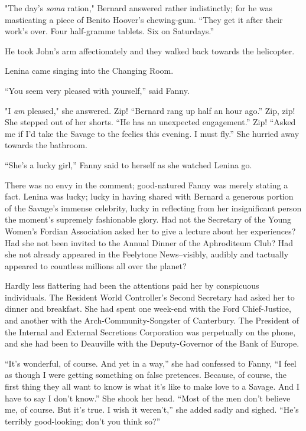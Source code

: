 \documentclass[12pt]{report}
\begin{document}
"The day's \emph{soma} ration," Bernard answered rather indistinctly;
for he was masticating a piece of Benito Hoover's chewing-gum. ``They
get it after their work's over. Four half-gramme tablets. Six on
Saturdays.''

He took John's arm affectionately and they walked back towards the
helicopter.

Lenina came singing into the Changing Room.

``You seem very pleased with yourself,'' said Fanny.

"I \emph{am} pleased," she answered. Zip! ``Bernard rang up half an hour
ago.'' Zip, zip! She stepped out of her shorts. ``He has an unexpected
engagement.'' Zip! ``Asked me if I'd take the Savage to the feelies this
evening. I must fly.'' She hurried away towards the bathroom.

``She's a lucky girl,'' Fanny said to herself as she watched Lenina go.

There was no envy in the comment; good-natured Fanny was merely stating
a fact. Lenina was lucky; lucky in having shared with Bernard a generous
portion of the Savage's immense celebrity, lucky in reflecting from her
insignificant person the moment's supremely fashionable glory. Had not
the Secretary of the Young Women's Fordian Association asked her to give
a lecture about her experiences? Had she not been invited to the Annual
Dinner of the Aphroditeum Club? Had she not already appeared in the
Feelytone News--visibly, audibly and tactually appeared to countless
millions all over the planet?

Hardly less flattering had been the attentions paid her by conspicuous
individuals. The Resident World Controller's Second Secretary had asked
her to dinner and breakfast. She had spent one week-end with the Ford
Chief-Justice, and another with the Arch-Community-Songster of
Canterbury. The President of the Internal and External Secretions
Corporation was perpetually on the phone, and she had been to Deauville
with the Deputy-Governor of the Bank of Europe.

``It's wonderful, of course. And yet in a way,'' she had confessed to
Fanny, ``I feel as though I were getting something on false pretences.
Because, of course, the first thing they all want to know is what it's
like to make love to a Savage. And I have to say I don't know.'' She
shook her head. ``Most of the men don't believe me, of course. But it's
true. I wish it weren't,'' she added sadly and sighed. ``He's terribly
good-looking; don't you think so?''
\end{document}
